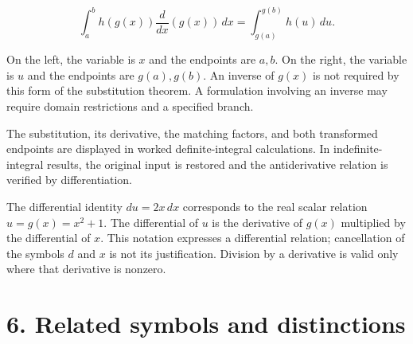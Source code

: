 \documentclass[11pt,oneside,openany]{book}
\begin{document}
\[
\int_a^b h(g(x))\frac{d}{dx}\left(g(x)\right)\,dx
=\int_{g(a)}^{g(b)}h(u)\,du.
\]

On the left, the variable is \(x\) and the endpoints are \(a,b\). On the
right, the variable is \(u\) and the endpoints are \(g(a),g(b)\). An inverse
of \(g(x)\) is not required by this form of the substitution theorem. A
formulation involving an inverse may require domain restrictions and a
specified branch.

The substitution, its derivative, the matching factors, and both
transformed endpoints are displayed in worked definite-integral
calculations. In indefinite-integral results, the original input is
restored and the antiderivative relation is verified by differentiation.

The differential identity \(du=2x\,dx\) corresponds to the real scalar
relation \(u=g(x)=x^2+1\). The differential of \(u\) is the derivative of
\(g(x)\) multiplied by the differential of \(x\). This notation expresses a
differential relation; cancellation of the symbols \(d\) and \(x\) is not
its justification. Division by a derivative is valid only where that
derivative is nonzero.
\clearpage

\section{6. Related symbols and distinctions}
\end{document}
